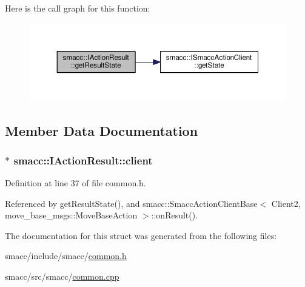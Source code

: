 Here is the call graph for this function\+:
\nopagebreak
\begin{figure}[H]
\begin{center}
\leavevmode
\includegraphics[width=350pt]{structsmacc_1_1IActionResult_af33869a3b1711af070597b8fe605ce70_cgraph}
\end{center}
\end{figure}




\subsection{Member Data Documentation}
\subsubsection[{\texorpdfstring{client}{client}}]{$\ast$ smacc\+::\+I\+Action\+Result\+::client}\hypertarget{structsmacc_1_1IActionResult_a8768f186e223b75188025f318d156ee2}{}\label{structsmacc_1_1IActionResult_a8768f186e223b75188025f318d156ee2}


Definition at line 37 of file common.\+h.



Referenced by get\+Result\+State(), and smacc\+::\+Smacc\+Action\+Client\+Base$<$ Client2, move\+\_\+base\+\_\+msgs\+::\+Move\+Base\+Action $>$\+::on\+Result().



The documentation for this struct was generated from the following files\+:\begin{DoxyCompactItemize}
\item 
smacc/include/smacc/\hyperlink{common_8h}{common.\+h}\item 
smacc/src/smacc/\hyperlink{common_8cpp}{common.\+cpp}\end{DoxyCompactItemize}
